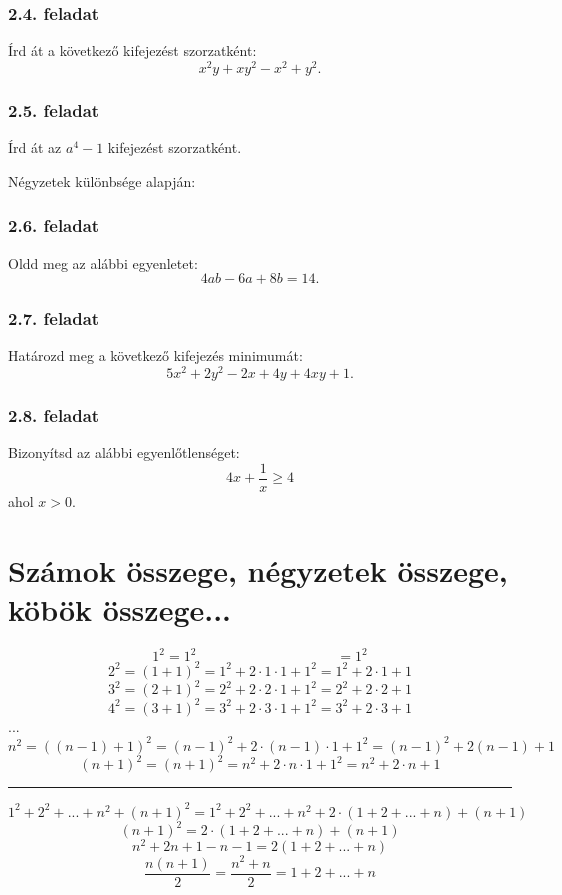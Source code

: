 \documentclass{article}
\begin{document}
\subsubsection{2.4. feladat}
Írd át a következő kifejezést szorzatként:
\begin{equation}
    x^2y+xy^2-x^2+y^2.
\end{equation}

\subsubsection{2.5. feladat}
Írd át az $a^4 - 1$ kifejezést szorzatként.

Négyzetek különbsége alapján:

\subsubsection{2.6. feladat}
Oldd meg az alábbi egyenletet:
\begin{equation}
    4ab-6a+8b = 14.
\end{equation}

\subsubsection{2.7. feladat}
Határozd meg a következő kifejezés minimumát:
\[
5x^2 + 2y^2 -2x +4y + 4xy + 1.
\]

\subsubsection{2.8. feladat}
Bizonyítsd az alábbi egyenlőtlenséget:
\[
4x+\frac{1}{x} \ge 4
\]
ahol $x > 0$.

\section{Számok összege, négyzetek összege, köbök összege...}
\[
1^2 = 1^2 \qquad\qquad\qquad\qquad\qquad =1^2
\]
\[
2^2 = (1 + 1)^2 = 1^2 + 2 \cdot 1 \cdot 1 + 1^2 = 1^2 + 2 \cdot 1 + 1
\]
\[
3^2 = (2 + 1)^2 = 2^2 + 2\cdot 2 \cdot 1 + 1^2 = 2^2 + 2 \cdot 2 + 1
\]
\[
4^2 = (3+1)^2 = 3^2 + 2\cdot3\cdot1 + 1^2 = 3^2 + 2\cdot 3 + 1
\]
...
\[
n^2 = ((n-1) + 1)^2 = (n-1)^2 + 2\cdot(n-1)\cdot1 + 1^2 = (n-1)^2 + 2(n-1) + 1
\]
\[
(n+1)^2 = (n+1)^2 = n^2 + 2 \cdot n \cdot 1 +1^2 = n^2 + 2\cdot n + 1
\]

\hrule

\[
1^2 + 2^2 + ... + n^2 + (n+1)^2 = 1^2 + 2^2 + ... + n^2 + 2\cdot(1 + 2 + ... + n) + (n+1)
\]
\[
(n+1)^2 = 2\cdot(1 + 2 + ... + n) + (n + 1)
\]
\[
n^2 + 2n + 1 - n - 1 = 2(1 + 2 + ... + n)
\]
\[
\frac{n(n+1)}{2} = \frac{n^2 + n}{2} = 1 + 2 + ... + n
\]
\end{document}
